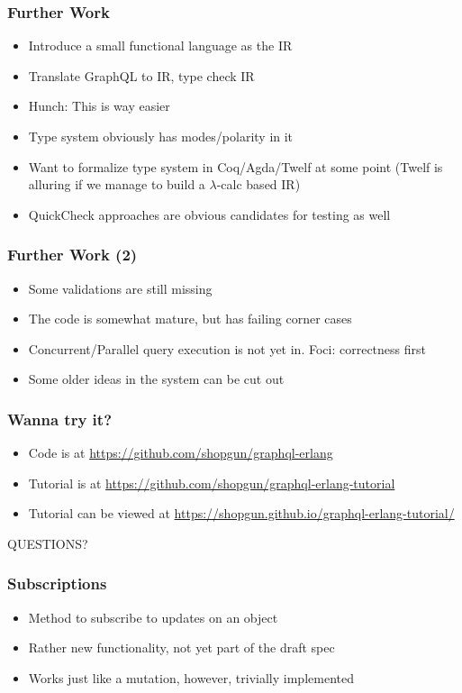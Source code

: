\documentclass[lualatex]{beamer}
\begin{document}
\begin{frame}
  \frametitle{Further Work}
  \begin{itemize}
  \item Introduce a small functional language as the IR
  \item Translate GraphQL to IR, type check IR
  \item Hunch: This is way easier
  \item Type system obviously has modes/polarity in it
  \item Want to formalize type system in Coq/Agda/Twelf at some point
    (Twelf is alluring if we manage to build a $\lambda{}$-calc based IR)
  \item QuickCheck approaches are obvious candidates for testing as well
  \end{itemize}
\end{frame}

\begin{frame}
  \frametitle{Further Work (2)}
  \begin{itemize}
  \item Some validations are still missing
  \item The code is somewhat mature, but has failing corner cases
  \item Concurrent/Parallel query execution is not yet in. Foci:
    correctness first
  \item Some older ideas in the system can be cut out
  \end{itemize}
\end{frame}

\begin{frame}
  \frametitle{Wanna try it?}
  \begin{itemize}
  \item Code is at \url{https://github.com/shopgun/graphql-erlang}
  \item Tutorial is at
    \url{https://github.com/shopgun/graphql-erlang-tutorial}
  \item Tutorial can be viewed at
    \url{https://shopgun.github.io/graphql-erlang-tutorial/}
  \end{itemize}
\end{frame}

\begin{frame}
  QUESTIONS?
\end{frame}

\begin{frame}
  \frametitle{Subscriptions}
  \begin{itemize}
  \item Method to subscribe to updates on an object
  \item Rather new functionality, not yet part of the draft spec
  \item Works just like a mutation, however, trivially implemented
  \end{itemize}
\end{frame}
\end{document}
